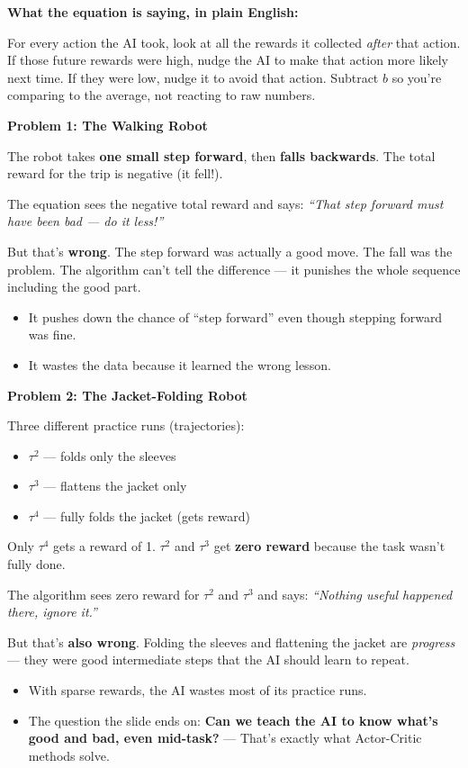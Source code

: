\textbf{What the equation is saying, in plain English:}

For every action the AI took, look at all the rewards it collected \textit{after} that action. If those future rewards were high, nudge the AI to make that action more likely next time. If they were low, nudge it to avoid that action. Subtract $b$ so you're comparing to the average, not reacting to raw numbers.

\medskip

\textbf{Problem 1: The Walking Robot}

The robot takes \textbf{one small step forward}, then \textbf{falls backwards}. The total reward for the trip is negative (it fell!).

The equation sees the negative total reward and says: \textit{``That step forward must have been bad --- do it less!''}

But that's \textbf{wrong}. The step forward was actually a good move. The fall was the problem. The algorithm can't tell the difference --- it punishes the whole sequence including the good part.

\begin{itemize}
    \item[$\times$] It pushes down the chance of ``step forward'' even though stepping forward was fine.
    \item[$\times$] It wastes the data because it learned the wrong lesson.
\end{itemize}

\medskip

\textbf{Problem 2: The Jacket-Folding Robot}

Three different practice runs (trajectories):

\begin{itemize}
    \item $\tau^2$ --- folds only the sleeves
    \item $\tau^3$ --- flattens the jacket only
    \item $\tau^4$ --- fully folds the jacket (gets reward)
\end{itemize}

Only $\tau^4$ gets a reward of 1. $\tau^2$ and $\tau^3$ get \textbf{zero reward} because the task wasn't fully done.

The algorithm sees zero reward for $\tau^2$ and $\tau^3$ and says: \textit{``Nothing useful happened there, ignore it.''}

But that's \textbf{also wrong}. Folding the sleeves and flattening the jacket are \textit{progress} --- they were good intermediate steps that the AI should learn to repeat.

\begin{itemize}
    \item[$\times$] With sparse rewards, the AI wastes most of its practice runs.
    \item[$\checkmark$] The question the slide ends on: \textbf{Can we teach the AI to know what's good and bad, even mid-task?} --- That's exactly what Actor-Critic methods solve.
\end{itemize}